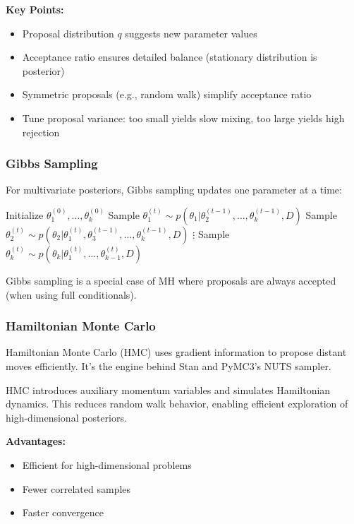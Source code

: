 \textbf{Key Points:}
\begin{itemize}
    \item Proposal distribution $q$ suggests new parameter values
    \item Acceptance ratio ensures detailed balance (stationary distribution is posterior)
    \item Symmetric proposals (e.g., random walk) simplify acceptance ratio
    \item Tune proposal variance: too small yields slow mixing, too large yields high rejection
\end{itemize}

\subsubsection{Gibbs Sampling}

For multivariate posteriors, Gibbs sampling updates one parameter at a time:

\begin{algorithm}[H]
\caption{Gibbs Sampling}
\begin{algorithmic}[1]
\STATE Initialize $\theta_1^{(0)}, \ldots, \theta_k^{(0)}$
    \STATE Sample $\theta_1^{(t)} \sim p(\theta_1 | \theta_2^{(t-1)}, \ldots, \theta_k^{(t-1)}, D)$
    \STATE Sample $\theta_2^{(t)} \sim p(\theta_2 | \theta_1^{(t)}, \theta_3^{(t-1)}, \ldots, \theta_k^{(t-1)}, D)$
    \STATE $\vdots$
    \STATE Sample $\theta_k^{(t)} \sim p(\theta_k | \theta_1^{(t)}, \ldots, \theta_{k-1}^{(t)}, D)$
\ENDFOR
\end{algorithmic}
\end{algorithm}

Gibbs sampling is a special case of MH where proposals are always accepted (when using full conditionals).

\subsubsection{Hamiltonian Monte Carlo}

Hamiltonian Monte Carlo (HMC) uses gradient information to propose distant moves efficiently. It's the engine behind Stan and PyMC3's NUTS sampler.

HMC introduces auxiliary momentum variables and simulates Hamiltonian dynamics. This reduces random walk behavior, enabling efficient exploration of high-dimensional posteriors.

\textbf{Advantages:}
\begin{itemize}
    \item Efficient for high-dimensional problems
    \item Fewer correlated samples
    \item Faster convergence
\end{itemize}

